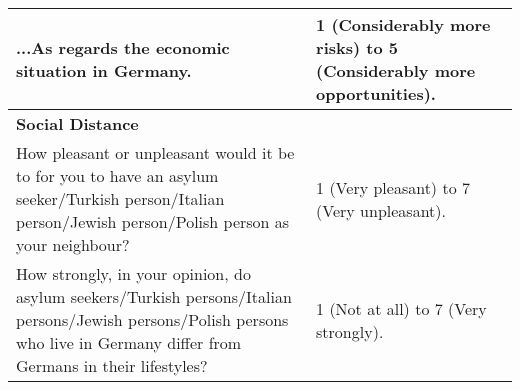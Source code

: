 \begin{center}
\begin{small}
\begin{longtable}{p{8cm}p{4cm}}
...As regards the economic situation in Germany. &  1 (Considerably more risks) to 5 (Considerably more opportunities).\\ 
\hline
\multicolumn{2}{l}{\textbf{Social Distance}}  \vspace{0.2cm} \\
How pleasant or unpleasant would it be to for you to have an asylum seeker/Turkish person/Italian person/Jewish person/Polish person as your neighbour? & 1 (Very pleasant) to 7 (Very unpleasant). \\
How strongly, in your opinion, do asylum seekers/Turkish persons/Italian persons/Jewish persons/Polish persons who live in Germany differ from Germans in their lifestyles? &  1 (Not at all) to 7 (Very strongly). \\
\end{longtable}
\end{small}
\end{center}

